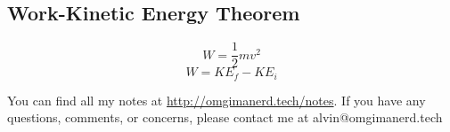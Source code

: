 \documentclass[letterpaper, 12pt]{math}
\begin{document}
\subsection*{Work-Kinetic Energy Theorem}
\[ W = \frac{1}{2}mv^2 \]
\[ W = KE_f-KE_i \]

\begin{center}
  You can find all my notes at \url{http://omgimanerd.tech/notes}. If you have
  any questions, comments, or concerns, please contact me at
  alvin@omgimanerd.tech
\end{center}
\end{document}
